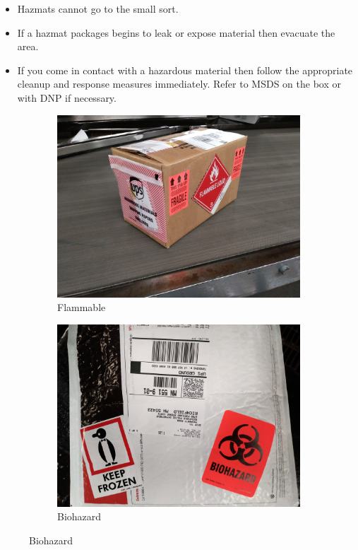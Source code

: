 \documentclass[12pt]{article}
\begin{document}
\begin{itemize}
    \item Hazmats cannot go to the small sort.
    \item If a hazmat packages begins to leak or expose material then evacuate the area.
    \item If you come in contact with a hazardous material then follow the appropriate cleanup and response measures immediately. Refer to MSDS on the box or with DNP if necessary.
\end{itemize}

\begin{figure}[H]
\begin{subfigure}{0.5\textwidth}
\centering
\includegraphics[width=0.7\linewidth]{20171221_183124} 
\caption{Flammable}
\end{subfigure}
\begin{subfigure}{0.5\textwidth}
\centering
\includegraphics[width=0.7\linewidth]{20171221_191646}
\caption{Biohazard}
\end{subfigure}
\end{figure}

\end{document}
